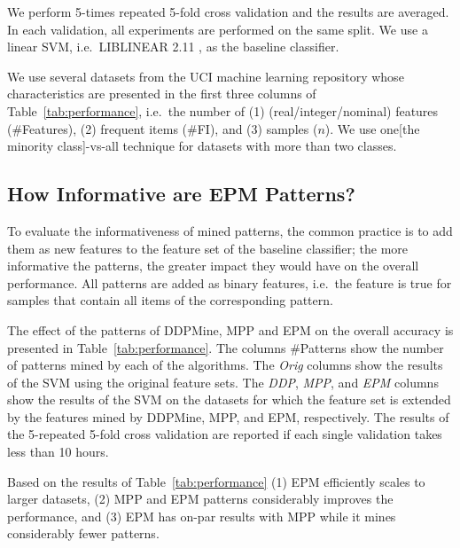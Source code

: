 We perform 5-times repeated 5-fold cross validation and the results are averaged.
In each validation, all experiments are performed on the same split.
We use a linear SVM, i.e.\  LIBLINEAR 2.11 \cite{fan08}, as the baseline classifier.

We use several datasets from the UCI machine learning repository \cite{Lichman:2013} whose
characteristics are presented in the first three columns of Table~\ref{tab:performance},
i.e.\ the number of (1) (real/integer/nominal) features (\#Features), (2) frequent items (\#FI), and (3) samples ($n$). 
We use one[the minority class]-vs-all technique for datasets with more than two classes.
\subsection{How Informative are EPM Patterns?}
To evaluate the informativeness of mined patterns,
the common practice is to add them as new features to the feature set of the baseline classifier;
the more informative the patterns, the greater impact they would have on the overall performance.
All patterns are added as binary features, i.e.\ 
the feature is true for samples that contain all items of the corresponding pattern.

The effect of the patterns of DDPMine, MPP and EPM on the overall accuracy 
is presented in Table~\ref{tab:performance}.  
The columns \#Patterns show the number of patterns mined by each of the algorithms. 
The \emph{Orig} columns
show the results of the SVM using the original feature sets.
The \emph{DDP}, \emph{MPP}, and \emph{EPM} columns show the results of the SVM 
on the datasets for which the feature set is extended by 
the features mined by DDPMine, MPP, and EPM, respectively.
The results of the 5-repeated 5-fold cross validation are reported
if each single validation takes less than 10 hours. 

Based on the results of Table~\ref{tab:performance} (1) EPM efficiently scales to larger datasets,
(2) MPP and EPM patterns considerably improves the performance,
and (3) EPM has on-par results with MPP while it mines considerably fewer patterns.
